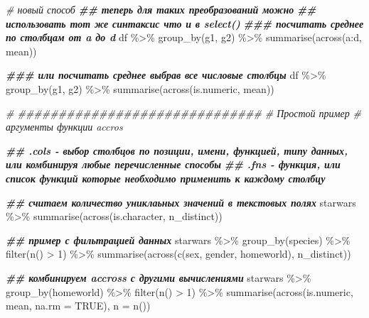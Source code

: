 \documentclass[
]{book}
\newenvironment{Shaded}{\begin{snugshade}}{\end{snugshade}}
\newcommand{\AttributeTok}[1]{\textcolor[rgb]{0.77,0.63,0.00}{#1}}
\newcommand{\CommentTok}[1]{\textcolor[rgb]{0.56,0.35,0.01}{\textit{#1}}}
\newcommand{\ConstantTok}[1]{\textcolor[rgb]{0.00,0.00,0.00}{#1}}
\newcommand{\DecValTok}[1]{\textcolor[rgb]{0.00,0.00,0.81}{#1}}
\newcommand{\DocumentationTok}[1]{\textcolor[rgb]{0.56,0.35,0.01}{\textbf{\textit{#1}}}}
\newcommand{\FunctionTok}[1]{\textcolor[rgb]{0.00,0.00,0.00}{#1}}
\newcommand{\NormalTok}[1]{#1}
\newcommand{\SpecialCharTok}[1]{\textcolor[rgb]{0.00,0.00,0.00}{#1}}
\begin{document}
\begin{Shaded}
\begin{Highlighting}[]
\CommentTok{\# новый способ}
\DocumentationTok{\#\# теперь для таких преобразований можно}
\DocumentationTok{\#\# использовать тот же синтаксис что и в select()}
\DocumentationTok{\#\#\# посчитать среднее по столбцам от a до d}
\NormalTok{df }\SpecialCharTok{\%\textgreater{}\%} 
  \FunctionTok{group\_by}\NormalTok{(g1, g2) }\SpecialCharTok{\%\textgreater{}\%} 
  \FunctionTok{summarise}\NormalTok{(}\FunctionTok{across}\NormalTok{(a}\SpecialCharTok{:}\NormalTok{d, mean))}

\DocumentationTok{\#\#\# или посчитать среднее выбрав все числовые столбцы }
\NormalTok{df }\SpecialCharTok{\%\textgreater{}\%} 
  \FunctionTok{group\_by}\NormalTok{(g1, g2) }\SpecialCharTok{\%\textgreater{}\%} 
  \FunctionTok{summarise}\NormalTok{(}\FunctionTok{across}\NormalTok{(is.numeric, mean))}

\CommentTok{\# \#\#\#\#\#\#\#\#\#\#\#\#\#\#\#\#\#\#\#\#\#\#\#\#\#\#\#\#\#\#}
\CommentTok{\# Простой пример}
\CommentTok{\# аргументы функции accros}

\DocumentationTok{\#\# .cols {-} выбор столбцов по позиции, имени, функцией, типу данных, или комбинируя любые перечисленные способы}
\DocumentationTok{\#\# .fns {-} функция, или список функций которые необходимо применить к каждому столбцу}

\DocumentationTok{\#\# считаем количество униклаьных значений в текстовых полях}
\NormalTok{starwars }\SpecialCharTok{\%\textgreater{}\%} 
  \FunctionTok{summarise}\NormalTok{(}\FunctionTok{across}\NormalTok{(is.character, n\_distinct))}

\DocumentationTok{\#\# пример с фильтрацией данных}
\NormalTok{starwars }\SpecialCharTok{\%\textgreater{}\%} 
  \FunctionTok{group\_by}\NormalTok{(species) }\SpecialCharTok{\%\textgreater{}\%} 
  \FunctionTok{filter}\NormalTok{(}\FunctionTok{n}\NormalTok{() }\SpecialCharTok{\textgreater{}} \DecValTok{1}\NormalTok{) }\SpecialCharTok{\%\textgreater{}\%} 
  \FunctionTok{summarise}\NormalTok{(}\FunctionTok{across}\NormalTok{(}\FunctionTok{c}\NormalTok{(sex, gender, homeworld), n\_distinct))}

\DocumentationTok{\#\# комбинируем accross с другими вычислениями}
\NormalTok{starwars }\SpecialCharTok{\%\textgreater{}\%} 
  \FunctionTok{group\_by}\NormalTok{(homeworld) }\SpecialCharTok{\%\textgreater{}\%} 
  \FunctionTok{filter}\NormalTok{(}\FunctionTok{n}\NormalTok{() }\SpecialCharTok{\textgreater{}} \DecValTok{1}\NormalTok{) }\SpecialCharTok{\%\textgreater{}\%} 
  \FunctionTok{summarise}\NormalTok{(}\FunctionTok{across}\NormalTok{(is.numeric, mean, }\AttributeTok{na.rm =} \ConstantTok{TRUE}\NormalTok{), }
            \AttributeTok{n =} \FunctionTok{n}\NormalTok{())}


\end{Highlighting}
\end{Shaded}
\end{document}
